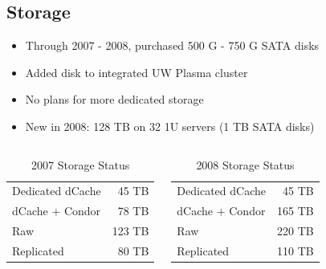 \documentclass{beamer}
\begin{document}
\subsection{Storage}
\begin{frame}
\begin{itemize}
    \item Through 2007 - 2008, purchased 500 G - 750 G SATA disks
    \item Added disk to integrated UW Plasma cluster
    \item No plans for more dedicated storage
    \item New in 2008: 128 TB on 32 1U servers (1 TB SATA disks)
\end{itemize}

\begin{columns}
\column{2.5in}
\begin{table}
    \begin{tabular}{lr}
        \toprule
        Dedicated dCache & 45 TB \\
        dCache + Condor & 78 TB \\
        \midrule
        Raw & 123 TB \\
        Replicated & 80 TB \\
        \bottomrule
    \end{tabular}
    \caption{2007 Storage Status}
    \label{2007_storage_status}
\end{table}

\column{2.5in}
\begin{table}
    \begin{tabular}{lr}
        \toprule
        Dedicated dCache & 45 TB \\
        dCache + Condor & 165 TB \\
        \midrule
        Raw & 220 TB \\
        Replicated & 110 TB \\
        \bottomrule
    \end{tabular}
    \caption{2008 Storage Status}
    \label{2008_storage_status}
\end{table}

\end{columns}
\end{frame}
\end{document}
